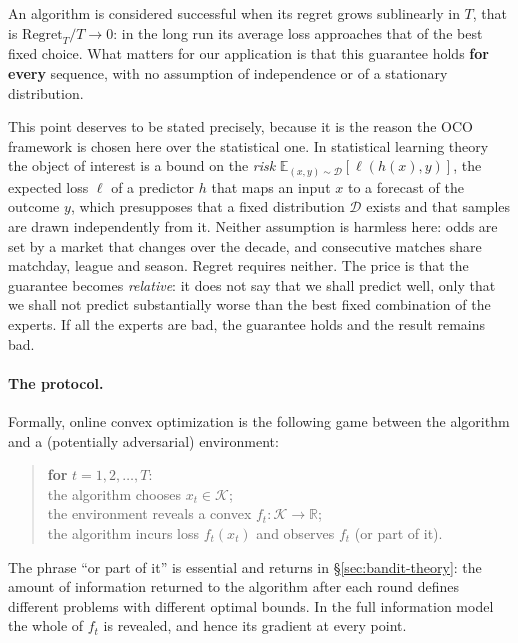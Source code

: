\documentclass[12pt,a4paper,oneside]{report}
\renewcommand{\_}{\oldunderscore\allowbreak}
\theoremstyle{definition}
\theoremstyle{plain}
\theoremstyle{definition}   %
\begin{document}
An algorithm is considered successful when its regret grows sublinearly in $T$, that is
$\mathrm{Regret}_T / T \to 0$: in the long run its average loss approaches that of the best
fixed choice. What matters for our application is that this guarantee holds \textbf{for
every} sequence, with no assumption of independence or of a stationary distribution.

This point deserves to be stated precisely, because it is the reason the OCO framework is
chosen here over the statistical one. In statistical learning theory the object of interest is
a bound on the \emph{risk} $\mathbb{E}_{(x,y)\sim\mathcal{D}}[\ell(h(x),y)]$, the expected loss $\ell$ of a
predictor $h$ that maps an input $x$ to a forecast of the outcome $y$, which presupposes
that a fixed distribution $\mathcal{D}$ exists and that samples are drawn independently from
it. Neither assumption is harmless here: odds are set by a market that changes over the
decade, and consecutive matches share matchday, league and season. Regret requires neither.
The price is that the guarantee becomes \emph{relative}: it does not say that we shall predict
well, only that we shall not predict substantially worse than the best fixed combination of
the experts. If all the experts are bad, the guarantee holds and the result remains bad.

\paragraph{The protocol.} Formally, online convex optimization is the following game between
the algorithm and a (potentially adversarial) environment:

\begin{quote}
\textbf{for} $t = 1,2,\dots,T$:\\[2pt]
\hspace*{1em} the algorithm chooses $x_t \in \mathcal{K}$;\\
\hspace*{1em} the environment reveals a convex $f_t : \mathcal{K}\to\mathbb{R}$;\\
\hspace*{1em} the algorithm incurs loss $f_t(x_t)$ and observes $f_t$ (or part of it).
\end{quote}

The phrase ``or part of it'' is essential and returns in \S\ref{sec:bandit-theory}: the amount
of information returned to the algorithm after each round defines different problems with
different optimal bounds. In the full information model the whole of $f_t$ is revealed, and
hence its gradient at every point.
\end{document}
